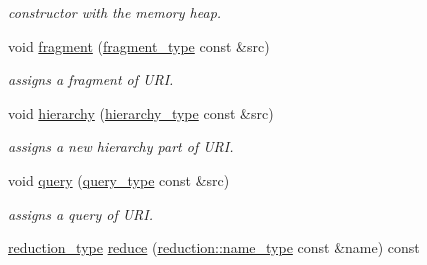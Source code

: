\begin{DoxyCompactItemize}
\begin{DoxyCompactList}\small\item\em constructor with the memory heap. \end{DoxyCompactList}\item 
\hypertarget{classhryky_1_1uri_1_1_entity_aa182043428f00f90fc524a4e18d0fe8d}{void \hyperlink{classhryky_1_1uri_1_1_entity_aa182043428f00f90fc524a4e18d0fe8d}{fragment} (\hyperlink{classhryky_1_1uri_1_1fragment_1_1_entity}{fragment\-\_\-type} const \&src)}\label{classhryky_1_1uri_1_1_entity_aa182043428f00f90fc524a4e18d0fe8d}

\begin{DoxyCompactList}\small\item\em assigns a fragment of U\-R\-I. \end{DoxyCompactList}\item 
\hypertarget{classhryky_1_1uri_1_1_entity_a33528fdf080b78e977115af784f983b0}{void \hyperlink{classhryky_1_1uri_1_1_entity_a33528fdf080b78e977115af784f983b0}{hierarchy} (\hyperlink{classhryky_1_1uri_1_1hierarchy_1_1_entity}{hierarchy\-\_\-type} const \&src)}\label{classhryky_1_1uri_1_1_entity_a33528fdf080b78e977115af784f983b0}

\begin{DoxyCompactList}\small\item\em assigns a new hierarchy part of U\-R\-I. \end{DoxyCompactList}\item 
\hypertarget{classhryky_1_1uri_1_1_entity_a033e68dfdc2bb4475e49ccd9e3acf557}{void \hyperlink{classhryky_1_1uri_1_1_entity_a033e68dfdc2bb4475e49ccd9e3acf557}{query} (\hyperlink{classhryky_1_1uri_1_1query_1_1_entity}{query\-\_\-type} const \&src)}\label{classhryky_1_1uri_1_1_entity_a033e68dfdc2bb4475e49ccd9e3acf557}

\begin{DoxyCompactList}\small\item\em assigns a query of U\-R\-I. \end{DoxyCompactList}\item 
\hypertarget{classhryky_1_1uri_1_1_entity_a4eb2eb853b25f7ce3fef477f091b4356}{\hyperlink{namespacehryky_a343a9a4c36a586be5c2693156200eadc}{reduction\-\_\-type} \hyperlink{classhryky_1_1uri_1_1_entity_a4eb2eb853b25f7ce3fef477f091b4356}{reduce} (\hyperlink{namespacehryky_1_1reduction_ac686c30a4c8d196bbd0f05629a6b921f}{reduction\-::name\-\_\-type} const \&name) const }\label{classhryky_1_1uri_1_1_entity_a4eb2eb853b25f7ce3fef477f091b4356}


\end{DoxyCompactItemize}
